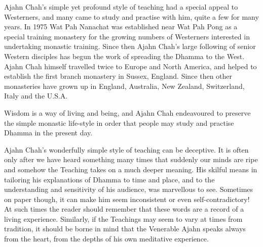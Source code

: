 Ajahn Chah’s simple yet profound style of teaching had a special appeal to Westerners, and many came to study and practise with him, quite a few for many years. In 1975 Wat Pah Nanachat was established near Wat Pah Pong as a special training monastery for the growing numbers of Westerners interested in undertaking monastic training.  Since then Ajahn Chah’s large following of senior Western disciples has begun the work of spreading the Dhamma to the West. Ajahn Chah himself travelled twice to Europe and North America, and helped to establish the first branch monastery in Sussex, England.  Since then other monasteries have grown up in England, Australia, New Zealand, Switzerland, Italy and the U.S.A.

Wisdom is a way of living and being, and Ajahn Chah endeavoured to preserve the simple monastic life-style in order that people may study and practise Dhamma in the present day.

Ajahn Chah’s wonderfully simple style of teaching can be deceptive.  It is often only after we have heard something many times that suddenly our minds are ripe and somehow the Teaching takes on a much deeper meaning.  His skilful means in tailoring his explanations of Dhamma to time and place, and to the understanding and sensitivity of his audience, was marvellous to see.  Sometimes on paper though, it can make him seem inconsistent or even self-contradictory!  At such times the reader should remember that these words are a record of a living experience.  Similarly, if the Teachings may seem to vary at times from tradition, it should be borne in mind that the Venerable Ajahn speaks always from the heart, from the depths of his own meditative experience.
